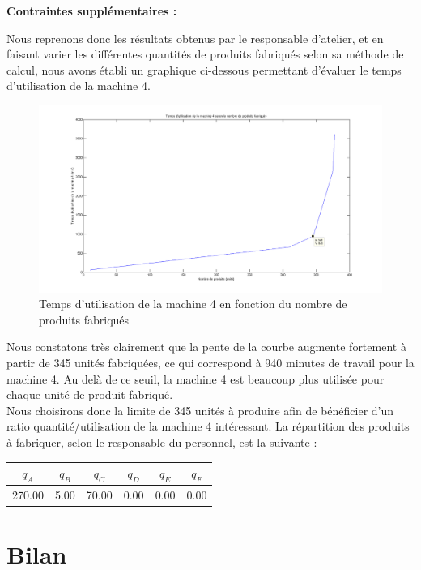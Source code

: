 \documentclass[paper=a4, fontsize=11pt]{report}
\numberwithin{equation}{section}		%
\numberwithin{figure}{section}			%
\numberwithin{table}{section}				%
\renewcommand{\bf}[1]{\textbf{#1}}
\begin{document}
\bf{Contraintes supplémentaires :}

Nous reprenons donc les résultats obtenus par le responsable d’atelier, et en faisant varier les différentes quantités de produits fabriqués selon sa méthode de calcul, nous avons établi un graphique ci-dessous permettant d’évaluer le temps d’utilisation de la machine 4.\\

\begin{figure}[H]
\caption{Temps d'utilisation de la machine 4 en fonction du nombre de produits fabriqués}
\centering
\includegraphics[width=16cm]{figures/graphe-personnel.png}
\end{figure}

Nous constatons très clairement que la pente de la courbe augmente fortement à partir de 345 unités fabriquées, ce qui correspond à 940 minutes de travail pour la machine 4. Au delà de ce seuil, la machine 4 est beaucoup plus utilisée pour chaque unité de produit fabriqué.\\

Nous choisirons donc la limite de 345 unités à produire afin de bénéficier d'un ratio quantité/utilisation de la machine 4 intéressant. La répartition des produits à fabriquer, selon le responsable du personnel, est la suivante : 

\begin{center}
\begin{tabular}{cccccc}
\hline
$q_A$ & $q_B$ & $q_C$ & $q_D$ & $q_E$ & $q_F$ \\
\hline
270.00 & 5.00 & 70.00 & 0.00 & 0.00 & 0.00 \\
\hline
\end{tabular}
\end{center}

\section{Bilan}
\end{document}
